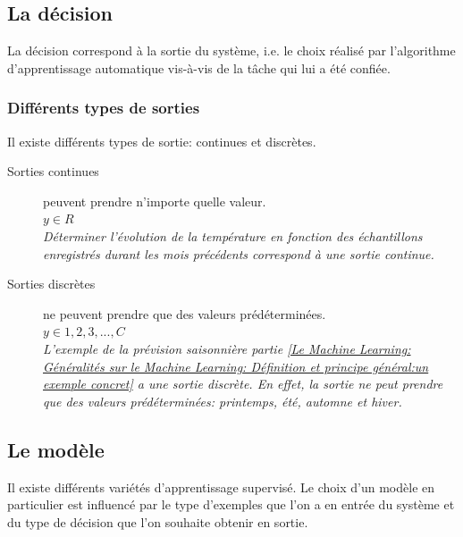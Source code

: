 \subsection{La décision}
\label{Le Machine Learning: Généralités sur le Machine Learning: La décision}
La décision correspond à la sortie du système, i.e. le choix réalisé par l'algorithme d'apprentissage automatique vis-à-vis de la tâche qui lui a été confiée.

\subsubsection{Différents types de sorties}
\label{Le Machine Learning: Généralités sur le Machine Learning: La décision: Différents types de sorties}
Il existe différents types de sortie: continues et discrètes.

\begin{description}
	\item [Sorties continues] peuvent prendre n'importe quelle valeur. \\
	 $y \in R$ \\
	 \textit{Déterminer l'évolution de la température en fonction des échantillons enregistrés durant les mois précédents correspond à une sortie continue.}
	\item [Sorties discrètes] ne peuvent prendre que des valeurs prédéterminées. \\
	 $y \in {1, 2, 3, ...,C}$ \\
	\textit{ L'exemple de la prévision saisonnière partie \ref{Le Machine Learning: Généralités sur le Machine Learning: Définition et principe général:un exemple concret} a une sortie discrète. En effet, la sortie ne peut prendre que des valeurs prédéterminées: printemps, été, automne et hiver.}
\end{description}



\subsection{Le modèle}
\label{Le Machine Learning: Généralités sur le Machine Learning: Le modèle}
Il existe différents variétés d'apprentissage supervisé. Le choix d'un modèle en particulier est influencé par le type d'exemples que l'on a en entrée du système et du type de décision que l'on souhaite obtenir en sortie.

